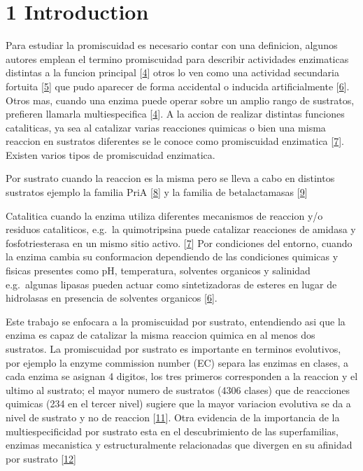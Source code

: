 \documentclass[12pt,twoside]{reedthesis}
\begin{document}
  \section{1 Introduction}\label{introduction}
  
  Para estudiar la promiscuidad es necesario contar con una definicion,
  algunos autores emplean el termino promiscuidad para describir
  actividades enzimaticas distintas a la funcion principal
  {[}\protect\hyperlink{ref-khersonskyux5fenzymeux5f2010}{4}{]} otros lo
  ven como una actividad secundaria fortuita
  {[}\protect\hyperlink{ref-copleyux5fenzymesux5f2003}{5}{]} que pudo
  aparecer de forma accidental o inducida artificialmente
  {[}\protect\hyperlink{ref-hultux5fenzymeux5f2007}{6}{]}. Otros mas,
  cuando una enzima puede operar sobre un amplio rango de sustratos,
  prefieren llamarla multiespecifica
  {[}\protect\hyperlink{ref-khersonskyux5fenzymeux5f2010}{4}{]}. A la
  accion de realizar distintas funciones cataliticas, ya sea al catalizar
  varias reacciones quimicas o bien una misma reaccion en sustratos
  diferentes se le conoce como promiscuidad enzimatica
  {[}\protect\hyperlink{ref-obrienux5fcatalyticux5f1999}{7}{]}. Existen
  varios tipos de promiscuidad enzimatica.
  
  Por sustrato cuando la reaccion es la misma pero se lleva a cabo en
  distintos sustratos ejemplo la familia PriA
  {[}\protect\hyperlink{ref-baronagomezux5foccurrenceux5f2003}{8}{]} y la
  familia de betalactamasas
  {[}\protect\hyperlink{ref-rissoux5fphenotypicux5f2014}{9}{]}
  
  Catalitica cuando la enzima utiliza diferentes mecanismos de reaccion
  y/o residuos cataliticos, e.g.~la quimotripsina puede catalizar
  reacciones de amidasa y fosfotriesterasa en un mismo sitio activo.
  {[}\protect\hyperlink{ref-obrienux5fcatalyticux5f1999}{7}{]} Por
  condiciones del entorno, cuando la enzima cambia su conformacion
  dependiendo de las condiciones quimicas y fisicas presentes como pH,
  temperatura, solventes organicos y salinidad e.g.~algunas lipasas pueden
  actuar como sintetizadoras de esteres en lugar de hidrolasas en
  presencia de solventes organicos
  {[}\protect\hyperlink{ref-hultux5fenzymeux5f2007}{6}{]}.
  
  Este trabajo se enfocara a la promiscuidad por sustrato, entendiendo asi
  que la enzima es capaz de catalizar la misma reaccion quimica en al
  menos dos sustratos. La promiscuidad por sustrato es importante en
  terminos evolutivos, por ejemplo la enzyme commission number (EC) separa
  las enzimas en clases, a cada enzima se asignan 4 digitos, los tres
  primeros corresponden a la reaccion y el ultimo al sustrato; el mayor
  numero de sustratos (4306 clases) que de reacciones quimicas (234 en el
  tercer nivel) sugiere que la mayor variacion evolutiva se da a nivel de
  sustrato y no de reaccion
  {[}\protect\hyperlink{ref-liux5fcomputationalux5f2004}{11}{]}. Otra
  evidencia de la importancia de la multiespecificidad por sustrato esta
  en el descubrimiento de las superfamilias, enzimas mecanistica y
  estructuralmente relacionadas que divergen en su afinidad por sustrato
  {[}\protect\hyperlink{ref-glasnerux5fevolutionux5f2006}{12}{]}
  
\end{document}
